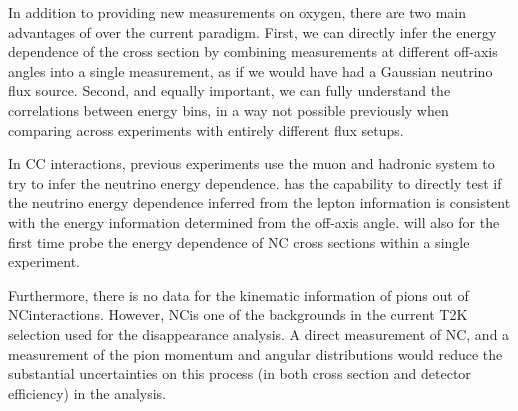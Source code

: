 In addition to providing new measurements on oxygen, there are two main advantages of \nuprismlite over the current paradigm. First, we can directly infer the energy dependence of the cross section by combining measurements at different off-axis angles into a single measurement, as if we would have had a Gaussian neutrino flux source. Second, and equally important, we can fully understand the correlations between energy bins, in a way not possible previously when comparing across experiments with entirely different flux setups.  

In CC interactions, previous experiments use the muon and hadronic system to try to infer the neutrino energy dependence.  \nuprismlite has the capability to directly test if the neutrino energy dependence inferred from the lepton information is consistent with the energy information determined from the off-axis angle. \nuprismlite will also for the first time probe the energy dependence of NC cross sections within a single experiment.  

 Furthermore, there is no data for the kinematic information of pions out of NC\pip interactions. However, NC\pip is one of the backgrounds in the current T2K \rmu selection used for the disappearance analysis. A direct measurement of NC\pip, and a measurement of the pion momentum and angular distributions would reduce the substantial uncertainties on this process (in both cross section and detector efficiency) in the analysis.





